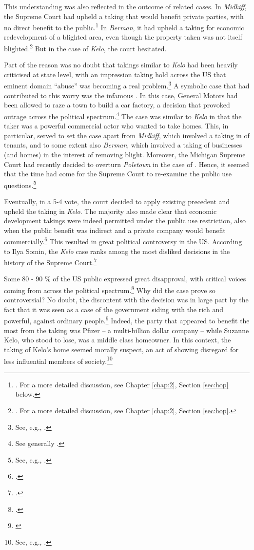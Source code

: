 This understanding was also reflected in the outcome of related cases. In {\it Midkiff}, the Supreme Court had upheld a taking that would benefit private parties, with no direct benefit to the public.\footnote{\cite{midkiff84}. For a more detailed discussion, see Chapter \ref{chap:2}, Section \ref{sec:hop} below.} In {\it Berman}, it had upheld a taking for economic redevelopment of a blighted area, even though the property taken was not itself blighted.\footnote{\cite{berman54}. For a more detailed discussion, see Chapter \ref{chap:2}, Section \ref{sec:hop}.} But in the case of {\it Kelo}, the court hesitated.

Part of the reason was no doubt that takings similar to {\it Kelo} had been heavily criticised at state level, with an impression taking hold across the US that eminent domain ``abuse'' was becoming a real problem.\footnote{See, e.g., \cite[667-669]{sandefur05}.} A symbolic case that had contributed to this worry was the infamous \textcite{poletown81}. In this case, General Motors had been allowed to raze a town to build a car factory, a decision that provoked outrage across the political spectrum.\footnote{See generally \cite{sandefur05}.} The case was similar to {\it Kelo} in that the taker was a powerful commercial actor who wanted to take homes. This, in particular, served to set the case apart from {\it Midkiff}, which involved a taking in  of tenants, and to some extent also {\it Berman}, which involved a taking of businesses (and homes) in the interest of removing blight. Moreover, the Michigan Supreme Court had recently decided to overturn {\it Poletown} in the case of \textcite{wayne04}. Hence, it seemed that the time had come for the Supreme Court to re-examine the public use questions.\footnote{See, e.g., \cite{sandefur05,claeys04}.}

Eventually, in a 5-4 vote, the court decided to apply existing precedent and upheld the taking in {\it Kelo}. The majority also made clear that economic development takings were indeed permitted under the public use restriction, also when the public benefit was indirect and a private company would benefit commercially.\footcite[469-470]{kelo05} This resulted in great political controversy in the US. According to Ilya Somin, the {\it Kelo} case ranks among the most disliked decisions in the history of the Supreme Court.\footcite[2]{somin11} 

Some 80 - 90 \% of the US public expressed great disapproval, with critical voices coming from across the political spectrum.\footcite[2108-2110]{somin09} Why did the case prove so controversial? No doubt, the discontent with the decision was  in large part by the fact that it was seen as a case of the government siding with the rich and powerful, against ordinary people.\footnote{\cite[630-634]{baron07}} Indeed, the party that appeared to benefit the most from the taking was Pfizer -- a multi-billion dollar company -- while Suzanne Kelo, who stood to lose, was a middle class homeowner. In this context, the taking of Kelo's home seemed morally suspect, an act of  showing disregard for less influential members of society.\footnote{See, e.g., \cite{underkuffler06}.}

